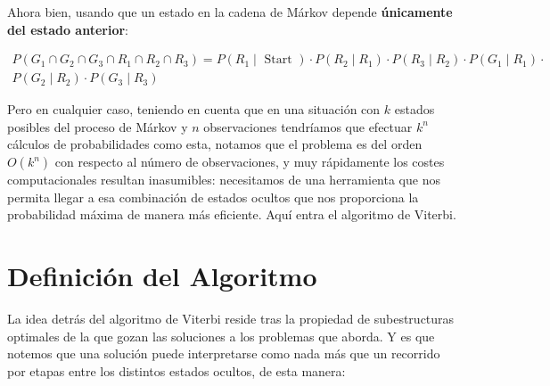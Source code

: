 \documentclass{article}
\begin{document}
Ahora bien, usando que un estado en la cadena de Márkov depende
\textbf{únicamente del estado anterior}:

\begin{multline*}
    P(G_1 \cap  G_2 \cap G_3 \cap R_1 \cap  R_2 \cap R_3) = P(R_1 \mid \text{ Start }) \cdot  P(R_2  \mid R_1) \cdot  P(R_3  \mid R_2) \cdot P(G_1  \mid R_1)  
    \cdot \\ P(  G_2 \mid R_2) \cdot P(  G_3  \mid  R_3) 
\end{multline*} 

Pero en cualquier caso, teniendo en cuenta que en una
situación con $k$ estados posibles del proceso de Márkov y
$n$ observaciones tendríamos que efectuar $k^{n}$ cálculos de 
probabilidades como esta, notamos que el problema es del orden
$O(k^{n})$ con respecto al número de observaciones, y muy 
rápidamente los costes computacionales resultan inasumibles:
necesitamos de una herramienta que nos permita llegar
a esa combinación de estados ocultos que nos proporciona la probabilidad máxima de manera más eficiente. Aquí entra el algoritmo de Viterbi.

\newpage
\section{Definición del Algoritmo}

La idea detrás del algoritmo de Viterbi reside tras la
propiedad de subestructuras optimales de la que gozan las 
soluciones a los problemas que aborda. Y es que notemos que
una solución puede interpretarse como nada más que un
recorrido por etapas entre los distintos estados ocultos, de esta manera:

\vspace{0.5cm}

\end{document}
